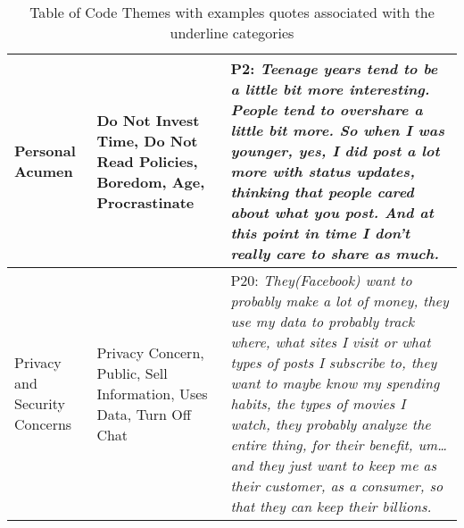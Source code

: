 \begin{table*}[htb!]
\begin{tabular}{ |p{2cm}||p{3cm}|p{8cm}| }
 \hline
 Personal Acumen    & Do Not Invest Time, Do Not Read Policies, Boredom, Age, Procrastinate& P2: \textit{Teenage years tend to be a little bit more interesting. People tend to overshare a little bit more. So when I was younger, yes, I did post a lot more with status updates, thinking that people cared about what you post. And at this point in time I don't really care to share as much. }\\
 \hline
 Privacy and Security Concerns  & Privacy Concern, Public, Sell Information, Uses Data, Turn Off Chat& P20: \textit{They(Facebook) want to probably make a lot of money, they use my data to probably track where, what sites I visit or what types of posts I subscribe to, they want to maybe know my spending habits, the types of movies I watch, they probably analyze the entire thing, for their benefit, um… and they just want to keep me as their customer, as a consumer, so that they can keep their billions.}\\ 
  \hline
 \hline
\end{tabular} 
\caption{Table of Code Themes with examples quotes associated with the underline categories}
 \label{table:coding}
\end{table*}

